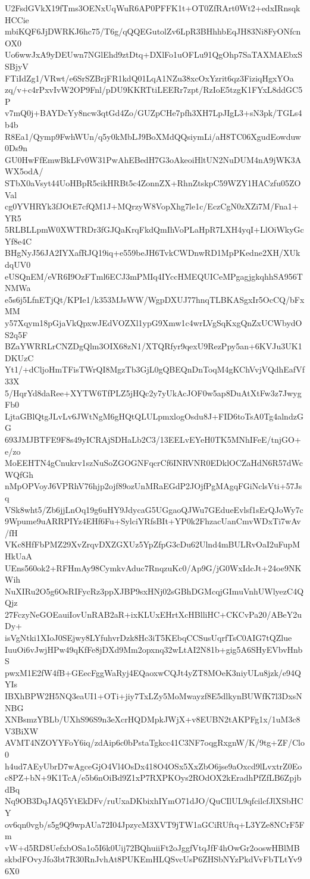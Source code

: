 U2FsdGVkX19fTms3OENxUqWuR6AP0PFFK1t+OT0ZfRArt0Wt2+edxIRnsqkHCCie
mbiKQF6JjDWRKJ6hc75/T6g/qQQEGutolZv6LpR3BHhhbEqJH83Ni8FyONfcnOX0
Uo6wwJxA9yDEUwn7NGlEhd9ztDtq+DXlFo1uOFLu91QgOhp7SaTAXMAEbxSSBjyV
FTiIdZg1/VRwt/e6SrSZBrjFR1kdQ01LqA1NZu38xcOxYzrit6qz3FiziqHgxYOa
zq/v+c4rPxvIvW2OP9Fnl/pDU9KKRTtiLEERr7zpt/RzIoE5tzgK1FYxL8ddGC5P
v7mQ0j+BAYDcYy8ncw3qtGd4Zo/GUZpCHe7pfh3XH7LpJIgL3+sN3pk/TGLs4b4b
R8Ea1/Qymp9FwhWUn/q5y0kMbLJ9BoXMdQQsiymLi/aH8TC06XgudEowduw0Ds9n
GU0HwFfEmwBkLFv0W31PwAhEBedH7G3oAkeoiHltUN2NuDUM4nA9jWK3AWX5odA/
STbX0aVsyt44UoHBpR5cikHRBt5c4ZonnZX+RhnZtskpC59WZY1HACzfu05ZOVal
cg0YVHRYk3fJOtE7cfQM1J+MQrzyW8VopXhg7le1c/EczCgN0zXZi7M/Fna1+YR5
5RLBLLpmW0XWTRDr3fGJQaKrqFkdQmIhVoPLaHpR7LXH4yqI+LlOiWkyGcYf8e4C
BHgNyJ56JA2IYXafRJQ19iq+e559beJH6TvkCWDnwRD1MpPKedne2XH/XUkdqUV0
eUSQnEM/eVR6I9OzFTml6ECJ3mPMIq4IYccHMEQUICeMPgagjgkqhhSA956TNMWa
e5s6j5LfnETjQt/KPIe1/k353MJsWW/WgpDXUJ77hnqTLBKASgxIr5OcCQ/bFxMM
y57Xqym18pGjaVkQpxwJEdVOZXl1ypG9Xmw1c4wrLVgSqKxgQnZxUCWbydOS2q5F
BZaYWRRLrCNZDgQlm3OIX68zN1/XTQRfyr9qexU9RezPpy5an+6KVJu3UK1DKUzC
Yt1/+dCljoHmTFisTWrQI8MgzTb3GjL0gQBEQnDnToqM4gKChVvjVQdhEafVf33X
5/HqrYd8daRee+XYTW6TfPLZ5jHQc2y7yUkAcJOF0w5ap8DuAtXtFw3z7JwygFb0
LjtaGBlQtgJLvLv6JWtNgM6gHQtQLULpmxlogOsdu8J+FID6toTsA0Tg4alndzGG
693JMJBTFE9F8s49yICRAjSDHaLb2C3/13EELvEYeH0TK5MNhIFeE/tnjGO+e/zo
MoEEHTN4gCnukrv1szNuSoZGOGNFqcrCf6INRVNR0EDklOCZaHdN6R57dWcWQfGh
nMpOPVoyJ6VPRhV76hjp2ojf89ozUnMRaEGdP2JOjfPgMAgqFGiNclsVti+57Jsq
VSk8wht5/Zb6jjLnOq19g6uHY9JdycaG5UGgaoQJWu7GEdueEvlsf1sErQJoWy7c
9Wpume9uARRPIYz4EHf6Fu+SylciYRfsBIt+YP0k2FhzacUanCmvWDxTi7wAv/fH
VKc8HfFbPMZ29XvZrqvDXZGXUz5YpZfpG3cDu62Ulnd4mBULRvOaI2uFupMHkUaA
UEns560ok2+RFHmAy98CymkvAduc7RnqzuKc0/Ap9G/jG0WxIdcJt+24oe9NKWih
NuXIRu2O5g6OsRIFycRz3ppXJBP9sxHNj02sGBhDGMcqjGImuVnhUWlyezC4QQjz
27FczyNeGOEauiIovUnRAB2aR+ixKLUxEHrtXcHBlliHC+CKCvPa20/ABeY2uDy+
isVgNtki1XIoJ0SEjwy8LYfuhvrDzk8Hc3iT5KEbqCCSusUqrfTsC0AIG7tQZlue
IuuOi6vJwjHPw49qKfFe8jDXd9Mm2opxnq32wLtAI2N81b+gig5A6SHyEVbvHnbS
pwxM1E2fW4fB+GEecFggWaRyj4EQaoxwCQJt4yZT8MOeK3niyULu8jzk/e94QYIs
IBXhBPW2H5NQ3eaUI1+OTi+jiy7TxLZy5MoMwayzf8E5dlkynBUWfK7l3DxsNNBG
XNBsmzYBLb/UXhS96S9n3eXcrHQDMpkJWjX+v8EUBN2tAKPFg1x/1uM3c8V3BiXW
AVMT4NZOYYFoY6iq/zdAip6c0bPstaTgkcc41C3NF7oqgRxgnW/K/9tg+ZF/Clo0
h4ud7AEyUbrD7wAgceGjO4Vl4OsDx418O4OSx5XxZbO6jse9aOxcd9lLvxtrZ0Eo
c8PZ+bN+9K1TcA/e5b6nOiBd9Z1xP7RXPKOys2ROdOX2kEradhPfZfLB6ZpjbdBq
Nq9OB3DqJAQ5YtEkDFv/ruUxaDKbixhIYmO71dJO/QuCIlUL9qfcilcfJlXSbHCY
ov6qn0vgb/s5g9Q9wpAUa72I04JpzycM3XVT9jTW1aGCiRUftq+L3YZe8NCrF5Fm
vW+d5RD8UefxbOSa1o5I6k0Uij72BQhuiiFt2oJggfVtqJfF4hOwGr2ooswHBlMB
skbdFOvyJfo3bt7R30RnJvhAt8PUKEmHLQSvcUsP6ZHSbNYzPkdVvFbTLtYv96X0
